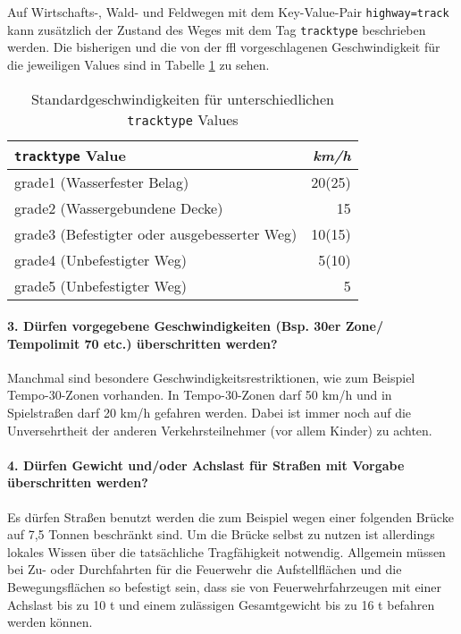 Auf Wirtschafts-, Wald- und Feldwegen mit dem Key-Value-Pair \texttt{highway=track} kann zusätzlich der Zustand des Weges mit dem Tag \texttt{tracktype} beschrieben werden.
Die bisherigen und die von der \gls{ffl} vorgeschlagenen Geschwindigkeit für die jeweiligen Values sind in Tabelle \ref{tab:speedinfotrack} zu sehen.

\begin{table}[h]
\centering
\caption{Standardgeschwindigkeiten für unterschiedlichen \texttt{tracktype} Values}
\label{tab:speedinfotrack}
\begin{tabular}{|l|r|}
\hline
\texttt{tracktype} Value & \textit{km/h} \\
\hline
grade1 (Wasserfester Belag) & 20(25)   \\
grade2 (Wassergebundene Decke) & 15  \\
grade3 (Befestigter oder ausgebesserter Weg) & 10(15)  \\
grade4 (Unbefestigter Weg) & 5(10)   \\
grade5 (Unbefestigter Weg) & 5   \\
\hline
\end{tabular}
\end{table}

\paragraph*{3. Dürfen vorgegebene Geschwindigkeiten (Bsp. 30er Zone/ Tempolimit 70 etc.) überschritten werden?}
\label{frage3}
\par
Manchmal sind besondere Geschwindigkeitsrestriktionen, wie zum Beispiel Tempo-30-Zonen vorhanden.
In Tempo-30-Zonen darf 50 km/h und in Spielstraßen darf 20 km/h gefahren werden.
Dabei ist immer noch auf die Unversehrtheit der anderen Verkehrsteilnehmer (vor allem Kinder) zu achten.

\paragraph*{4. Dürfen Gewicht und/oder Achslast für Straßen mit Vorgabe überschritten werden?}
\label{frage4}
\par
Es dürfen Straßen benutzt werden die zum Beispiel wegen einer folgenden Brücke auf 7,5 Tonnen beschränkt sind.
Um die Brücke selbst zu nutzen ist allerdings lokales Wissen über die tatsächliche Tragfähigkeit notwendig.
Allgemein müssen bei Zu- oder Durchfahrten für die Feuerwehr die Aufstellflächen und die Bewegungsflächen so befestigt sein, dass sie von Feuerwehrfahrzeugen mit einer Achslast bis zu 10 t und einem zulässigen Gesamtgewicht bis zu 16 t befahren werden können.

